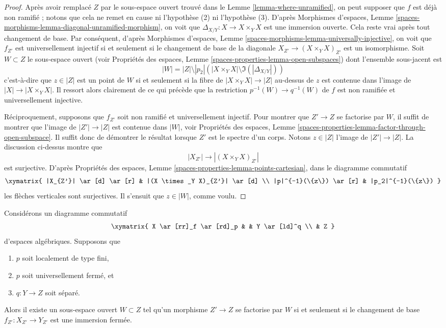 \begin{proof}
Après avoir remplacé $Z$ par le sous-espace ouvert trouvé dans le
Lemme \ref{lemma-where-unramified},
on peut supposer que $f$ est déjà non ramifié ; notons que cela ne
remet en cause ni l'hypothèse (2) ni l'hypothèse (3). D'après
Morphismes d'espaces, Lemme
\ref{spaces-morphisms-lemma-diagonal-unramified-morphism},
on voit que $\Delta_{X/Y} : X \to X \times_Y X$ est une immersion ouverte.
Cela reste vrai après tout changement de base. Par conséquent, d'après
Morphismes d'espaces, Lemme
\ref{spaces-morphisms-lemma-universally-injective},
on voit que $f_{Z'}$ est universellement injectif si et seulement si
le changement de base de la diagonale $X_{Z'} \to (X \times_Y X)_{Z'}$
est un isomorphisme. Soit $W \subset Z$ le sous-espace ouvert
(voir
Propriétés des espaces, Lemme
\ref{spaces-properties-lemma-open-subspaces})
dont l'ensemble sous-jacent est
$$
|W| = |Z| \setminus
|p_2|\left(|X \times_Y X| \setminus \Im(|\Delta_{X/Y}|)\right)
$$
c'est-à-dire que $z \in |Z|$ est un point de $W$ si et seulement si la fibre de
$|X \times_Y X| \to |Z|$ au-dessus de $z$ est contenue dans l'image de
$|X| \to |X \times_Y X|$. Il ressort alors clairement de ce qui précède
que la restriction $p^{-1}(W) \to q^{-1}(W)$ de $f$ est
non ramifiée et universellement injective.

\medskip\noindent
Réciproquement, supposons que $f_{Z'}$ soit non ramifié et universellement injectif.
Pour montrer que $Z' \to Z$ se factorise par $W$, il suffit de montrer
que l'image de $|Z'| \to |Z|$ est contenue dans $|W|$, voir
Propriétés des espaces, Lemme
\ref{spaces-properties-lemma-factor-through-open-subspace}.
Il suffit donc de démontrer le résultat lorsque $Z'$ est le spectre d'un corps.
Notons $z \in |Z|$ l'image de $|Z'| \to |Z|$. La discussion ci-dessus montre
que
$$
|X_{Z'}| \longrightarrow |(X \times_Y X)_{Z'}|
$$
est surjective. D'après
Propriétés des espaces,
Lemme \ref{spaces-properties-lemma-points-cartesian},
dans le diagramme commutatif
$$
\xymatrix{
|X_{Z'}| \ar[d] \ar[r] &
|(X \times_Y X)_{Z'}| \ar[d] \\
|p|^{-1}(\{z\}) \ar[r] &
|p_2|^{-1}(\{z\})
}
$$
les flèches verticales sont surjectives. Il s'ensuit que $z \in |W|$, comme voulu.
\end{proof}

\begin{lemma}
\label{lemma-where-closed-immersion}
Considérons un diagramme commutatif
$$
\xymatrix{
X \ar[rr]_f \ar[rd]_p & & Y \ar[ld]^q \\
& Z
}
$$
d'espaces algébriques. Supposons que
\begin{enumerate}
\item $p$ soit localement de type fini,
\item $p$ soit universellement fermé, et
\item $q : Y \to Z$ soit séparé.
\end{enumerate}
Alors il existe un sous-espace ouvert $W \subset Z$
tel qu'un morphisme $Z' \to Z$ se factorise par $W$ si et seulement si le
changement de base $f_{Z'} : X_{Z'} \to Y_{Z'}$ est une immersion fermée.
\end{lemma}


